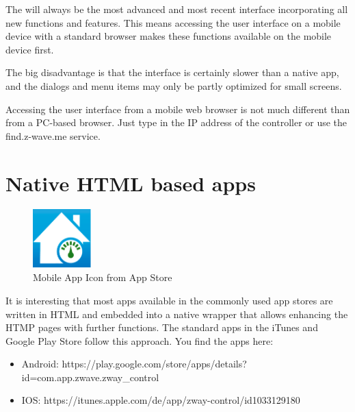 The \zwshui will always be the most advanced and most recent interface 
incorporating all new functions and features. This means accessing the user interface 
on a mobile device with a standard browser makes these functions available on the 
mobile device first.

The big disadvantage is that the interface is certainly slower than a native app, and the 
dialogs and menu items may only be partly optimized for small screens.

Accessing the user interface from a mobile web browser is not much different than from a 
PC-based browser. Just type in the IP address of the controller or use the find.z-wave.me service.

\section{Native HTML based apps}

\begin{figure}
\begin{center}
\includegraphics[width=0.2\textwidth]{pngs/cap5/mobile2.png}
\caption{Mobile App Icon from App Store}
\label{mobile2}
\end{center}
\end{figure}

It is interesting that most apps available in the commonly used app stores are written 
in HTML and embedded into a native wrapper that allows enhancing the HTMP pages with 
further functions. The standard \zway apps in the iTunes and Google Play Store follow 
this approach. You find the apps here:

\begin{itemize}
\item Android: https://play.google.com/store/apps/details? id=com.app.zwave.zway\_control
\item IOS: https://itunes.apple.com/de/app/zway-control/id1033129180
\end{itemize}


